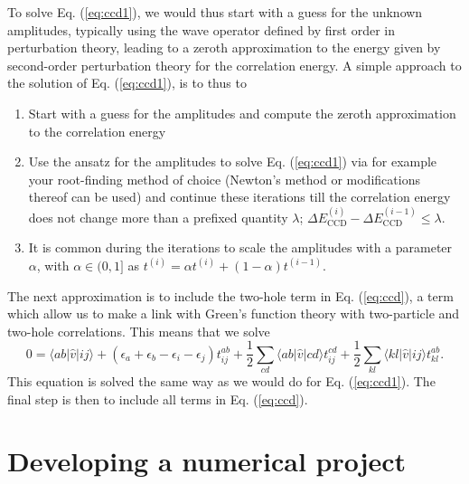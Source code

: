 To solve Eq. (\ref{eq:ccd1}), we would thus start with a guess for the unknown amplitudes, typically using the wave operator defined by first order in perturbation theory, leading to a zeroth approximation to the energy given by second-order perturbation theory for the correlation energy.
A simple approach to the solution of  Eq. (\ref{eq:ccd1}), is to thus to
\begin{enumerate}
\item Start with a guess for the amplitudes and compute the zeroth approximation to the correlation energy

\item Use the ansatz for the amplitudes to solve Eq. (\ref{eq:ccd1}) via for example your root-finding method of choice (Newton's method or modifications thereof can be used) and continue these iterations till the correlation energy does not change more than a prefixed quantity $\lambda$; $\Delta E_{\mathrm{CCD}}^{(i)}-\Delta E_{\mathrm{CCD}}^{(i-1)} \le \lambda$.

\item It is common during the iterations to scale the amplitudes with a parameter $\alpha$, with $\alpha \in (0,1]$ as  $t^{(i)}=\alpha t^{(i)}+(1-\alpha)t^{(i-1)}$.
\end{enumerate}

\noindent
The next approximation is to include the two-hole term in Eq. (\ref{eq:ccd}), a term which allow us to make a link with Green's function theory with two-particle and two-hole correlations. This means that we solve
\begin{equation}
0 = \langle ab \vert \hat{v} \vert ij \rangle + \left(\epsilon_a+\epsilon_b-\epsilon_i-\epsilon_j\right)t_{ij}^{ab}+\frac{1}{2}\sum_{cd} \langle ab \vert \hat{v} \vert cd \rangle t_{ij}^{cd}+\frac{1}{2}\sum_{kl} \langle kl \vert \hat{v} \vert ij \rangle t_{kl}^{ab}.
\label{eq:ccd2}
\end{equation}
This equation is solved the same way as we would do for Eq. (\ref{eq:ccd1}). The final step is then to include all terms in Eq. (\ref{eq:ccd}). 

\section{Developing a numerical project}

